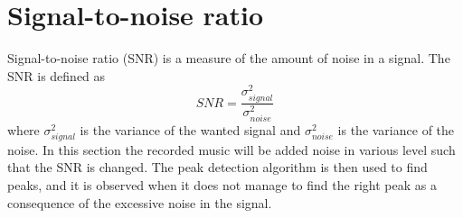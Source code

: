 \section{Signal-to-noise ratio}
Signal-to-noise ratio (SNR) is a measure of the amount of noise in a signal. The SNR is defined as
\begin{equation}\label{eq:SNR}
SNR=\frac{\sigma_{signal}^2}{\sigma_{noise}^2}
\end{equation}
where $\sigma_{signal}^2$ is the variance of the wanted signal and $\sigma_{noise}^2$ is the variance of the noise. In this section the recorded music will be added noise in various level such that the SNR is changed. The peak detection algorithm is then used to find peaks, and it is observed when it does not manage to find the right peak as a consequence of the excessive noise in the signal.